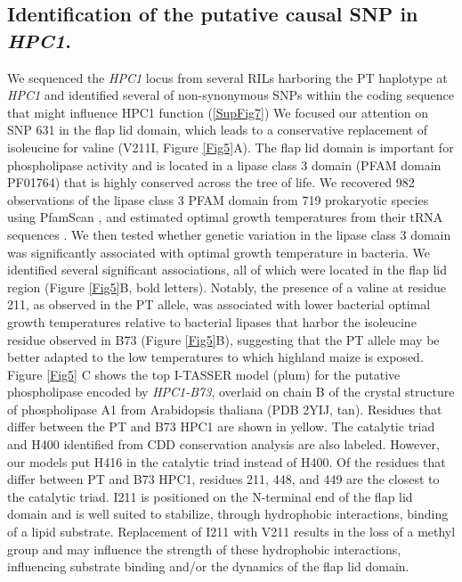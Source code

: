 \documentclass[9pt,twocolumn,twoside,lineno]{BioRxiv}
\begin{document}
\subsection{Identification of the putative causal SNP in \textit{HPC1}.} 
We sequenced the \textit{HPC1} locus from several RILs harboring the PT haplotype at \textit{HPC1} and identified several of non-synonymous SNPs within the coding sequence that might influence HPC1 function (\ref{SupFig7})
We focused our attention on SNP 631 in the flap lid domain, which leads to a conservative replacement of isoleucine for valine (V211I, Figure \ref{Fig5}A).  
The flap lid domain is important for phospholipase activity and is located in a lipase class 3 domain (PFAM domain PF01764) that is highly conserved across the tree of life. 
We recovered 982 observations of the lipase class 3 PFAM domain from 719 prokaryotic species using PfamScan \cite{Potter2018-tk, El-Gebali2019-pw}, and estimated optimal growth temperatures from their tRNA sequences \cite{Cimen2020-dm}.
We then tested whether genetic variation in the lipase class 3 domain was significantly associated with optimal growth temperature in bacteria. 
We identified several significant associations, all of which were located in the flap lid region (Figure \ref{Fig5}B, bold letters).  
Notably, the presence of a valine at residue 211, as observed in the PT allele, was associated with lower bacterial optimal growth temperatures relative to bacterial lipases that harbor the isoleucine residue observed in B73 (Figure \ref{Fig5}B), suggesting that the PT allele may be better adapted to the low temperatures to which highland maize is exposed.
Figure \ref{Fig5} C shows the top I-TASSER model (plum) for the putative phospholipase encoded by \textit{HPC1-B73}, overlaid on chain B of the crystal structure of phospholipase A1 from Arabidopsis thaliana (PDB 2YIJ, tan). 
Residues that differ between the PT and B73 HPC1 are shown in yellow. 
The catalytic triad and H400 identified from CDD conservation analysis are also labeled.
However, our models put H416 in the catalytic triad instead of H400. 
Of the residues that differ between PT and B73 HPC1, residues 211, 448, and 449 are the closest to the catalytic triad. 
I211 is positioned on the N-terminal end of the flap lid domain and is well suited to stabilize, through hydrophobic interactions, binding of a lipid substrate.
Replacement of I211 with V211 results in the loss of a methyl group and may influence the strength of these hydrophobic interactions, influencing substrate binding and/or the dynamics of the flap lid domain.
\end{document}
